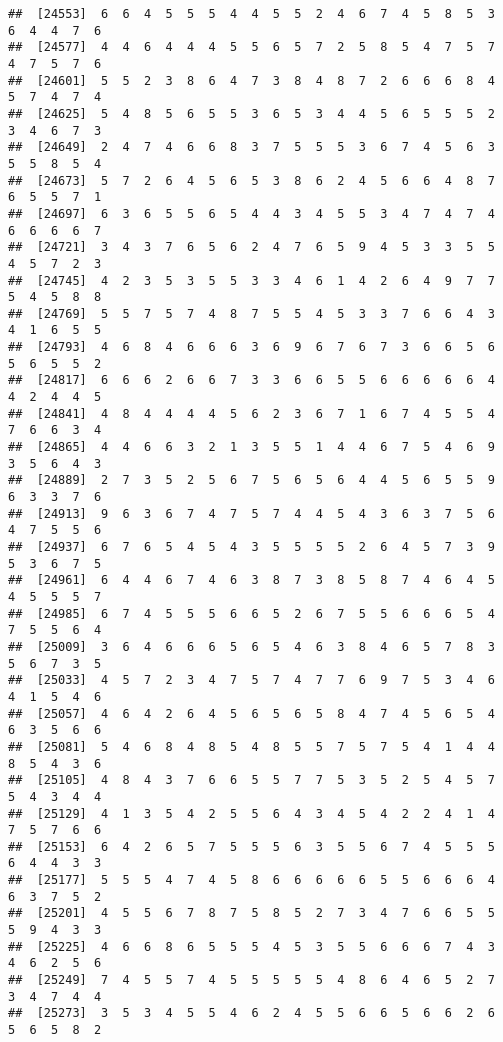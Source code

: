 \documentclass[
]{book}
\begin{document}
\begin{verbatim}
##  [24553]  6  6  4  5  5  5  4  4  5  5  2  4  6  7  4  5  8  5  3  6  4  4  7  6
##  [24577]  4  4  6  4  4  4  5  5  6  5  7  2  5  8  5  4  7  5  7  4  7  5  7  6
##  [24601]  5  5  2  3  8  6  4  7  3  8  4  8  7  2  6  6  6  8  4  5  7  4  7  4
##  [24625]  5  4  8  5  6  5  5  3  6  5  3  4  4  5  6  5  5  5  2  3  4  6  7  3
##  [24649]  2  4  7  4  6  6  8  3  7  5  5  5  3  6  7  4  5  6  3  5  5  8  5  4
##  [24673]  5  7  2  6  4  5  6  5  3  8  6  2  4  5  6  6  4  8  7  6  5  5  7  1
##  [24697]  6  3  6  5  5  6  5  4  4  3  4  5  5  3  4  7  4  7  4  6  6  6  6  7
##  [24721]  3  4  3  7  6  5  6  2  4  7  6  5  9  4  5  3  3  5  5  4  5  7  2  3
##  [24745]  4  2  3  5  3  5  5  3  3  4  6  1  4  2  6  4  9  7  7  5  4  5  8  8
##  [24769]  5  5  7  5  7  4  8  7  5  5  4  5  3  3  7  6  6  4  3  4  1  6  5  5
##  [24793]  4  6  8  4  6  6  6  3  6  9  6  7  6  7  3  6  6  5  6  5  6  5  5  2
##  [24817]  6  6  6  2  6  6  7  3  3  6  6  5  5  6  6  6  6  6  4  4  2  4  4  5
##  [24841]  4  8  4  4  4  4  5  6  2  3  6  7  1  6  7  4  5  5  4  7  6  6  3  4
##  [24865]  4  4  6  6  3  2  1  3  5  5  1  4  4  6  7  5  4  6  9  3  5  6  4  3
##  [24889]  2  7  3  5  2  5  6  7  5  6  5  6  4  4  5  6  5  5  9  6  3  3  7  6
##  [24913]  9  6  3  6  7  4  7  5  7  4  4  5  4  3  6  3  7  5  6  4  7  5  5  6
##  [24937]  6  7  6  5  4  5  4  3  5  5  5  5  2  6  4  5  7  3  9  5  3  6  7  5
##  [24961]  6  4  4  6  7  4  6  3  8  7  3  8  5  8  7  4  6  4  5  4  5  5  5  7
##  [24985]  6  7  4  5  5  5  6  6  5  2  6  7  5  5  6  6  6  5  4  7  5  5  6  4
##  [25009]  3  6  4  6  6  6  5  6  5  4  6  3  8  4  6  5  7  8  3  5  6  7  3  5
##  [25033]  4  5  7  2  3  4  7  5  7  4  7  7  6  9  7  5  3  4  6  4  1  5  4  6
##  [25057]  4  6  4  2  6  4  5  6  5  6  5  8  4  7  4  5  6  5  4  6  3  5  6  6
##  [25081]  5  4  6  8  4  8  5  4  8  5  5  7  5  7  5  4  1  4  4  8  5  4  3  6
##  [25105]  4  8  4  3  7  6  6  5  5  7  7  5  3  5  2  5  4  5  7  5  4  3  4  4
##  [25129]  4  1  3  5  4  2  5  5  6  4  3  4  5  4  2  2  4  1  4  7  5  7  6  6
##  [25153]  6  4  2  6  5  7  5  5  5  6  3  5  5  6  7  4  5  5  5  6  4  4  3  3
##  [25177]  5  5  5  4  7  4  5  8  6  6  6  6  6  5  5  6  6  6  4  6  3  7  5  2
##  [25201]  4  5  5  6  7  8  7  5  8  5  2  7  3  4  7  6  6  5  5  5  9  4  3  3
##  [25225]  4  6  6  8  6  5  5  5  4  5  3  5  5  6  6  6  7  4  3  4  6  2  5  6
##  [25249]  7  4  5  5  7  4  5  5  5  5  5  4  8  6  4  6  5  2  7  3  4  7  4  4
##  [25273]  3  5  3  4  5  5  4  6  2  4  5  5  6  6  5  6  6  2  6  5  6  5  8  2

\end{verbatim}
\end{document}
